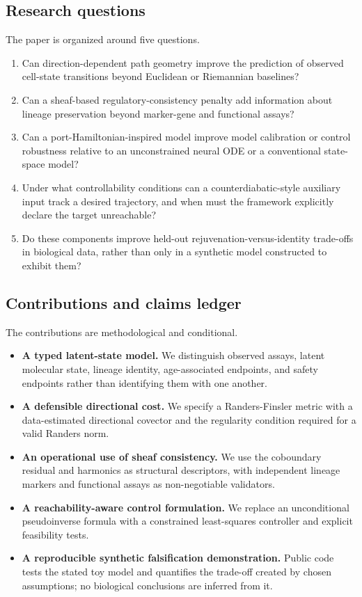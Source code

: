 \documentclass[11pt,a4paper]{article}
\theoremstyle{definition}
\theoremstyle{remark}
\begin{document}
\subsection{Research questions}
The paper is organized around five questions.
\begin{enumerate}
\item Can direction-dependent path geometry improve the prediction of observed cell-state transitions beyond Euclidean or Riemannian baselines?
\item Can a sheaf-based regulatory-consistency penalty add information about lineage preservation beyond marker-gene and functional assays?
\item Can a port-Hamiltonian-inspired model improve model calibration or control robustness relative to an unconstrained neural ODE or a conventional state-space model?
\item Under what controllability conditions can a counterdiabatic-style auxiliary input track a desired trajectory, and when must the framework explicitly declare the target unreachable?
\item Do these components improve held-out rejuvenation-versus-identity trade-offs in biological data, rather than only in a synthetic model constructed to exhibit them?
\end{enumerate}

\subsection{Contributions and claims ledger}
The contributions are methodological and conditional.
\begin{itemize}
\item \textbf{A typed latent-state model.} We distinguish observed assays, latent molecular state, lineage identity, age-associated endpoints, and safety endpoints rather than identifying them with one another.
\item \textbf{A defensible directional cost.} We specify a Randers-Finsler metric with a data-estimated directional covector and the regularity condition required for a valid Randers norm.
\item \textbf{An operational use of sheaf consistency.} We use the coboundary residual and harmonics as structural descriptors, with independent lineage markers and functional assays as non-negotiable validators.
\item \textbf{A reachability-aware control formulation.} We replace an unconditional pseudoinverse formula with a constrained least-squares controller and explicit feasibility tests.
\item \textbf{A reproducible synthetic falsification demonstration.} Public code tests the stated toy model and quantifies the trade-off created by chosen assumptions; no biological conclusions are inferred from it.
\end{itemize}
\end{document}
